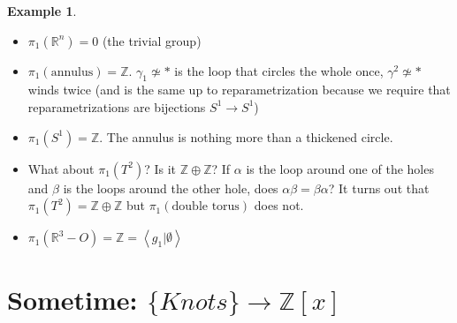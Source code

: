 \documentclass[11pt]{article}
\newcommand{\Z}{\mathbb{Z}}
\newcommand{\R}{\mathbb{R}}
\newcommand{\gen}[1]{\left\langle #1 \right\rangle}
\theoremstyle{plain}
\theoremstyle{definition}
\newtheorem{ex}{Example}
\begin{document}
\begin{ex}

  \begin{itemize}
    \item $\pi_1(\R^n) = 0$ (the trivial group)
    \item $\pi_1(\text{annulus}) = \Z$. $\gamma_1 \not \simeq \ast$ is the loop that circles the whole once, $\gamma^2 \not \simeq \ast$ winds twice (and is the same
      up to reparametrization because we require that reparametrizations are bijections  $S^1 \to S^1$)
    \item $\pi_1(S^1) = \Z$. The annulus is nothing more than a thickened circle.
    \item What about $\pi_1(T^2)$? Is it $\Z \oplus \Z$? If $\alpha$ is the loop around one of the holes and $\beta$ is the loops around the other hole,
      does $\alpha \beta = \beta \alpha$? It turns out that $\pi_1(T^2) = \Z \oplus \Z$ but $\pi_1(\text{double torus})$ does not.
    \item $\pi_1(\R^3 - O) = \Z = \gen{g_1 | \emptyset}$
  \end{itemize}

\end{ex}






\clearpage
\section{Sometime: $\lbrace Knots\rbrace\to\mathbb{Z}[x]$}
\end{document}
